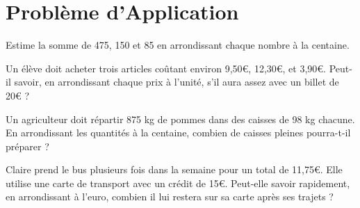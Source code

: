 \documentclass[11pt]{article}
\begin{document}
\section{Problème d'Application}

\begin{exercice}
Estime la somme de 475, 150 et 85 en arrondissant chaque nombre à la centaine.
\end{exercice}

\begin{exercice}
Un élève doit acheter trois articles coûtant environ 9,50€, 12,30€, et 3,90€. Peut-il savoir, en arrondissant chaque prix à l'unité, s'il aura assez avec un billet de 20€ ?
\end{exercice}

\begin{exercice}
Un agriculteur doit répartir 875 kg de pommes dans des caisses de 98 kg chacune. En arrondissant les quantités à la centaine, combien de caisses pleines pourra-t-il préparer ?
\end{exercice}

\begin{exercice}
 Claire prend le bus plusieurs fois dans la semaine pour un total de 11,75€. Elle utilise une carte de transport avec un crédit de 15€. Peut-elle savoir rapidement, en arrondissant à l’euro, combien il lui restera sur sa carte après ses trajets ?
\end{exercice}
\end{document}
